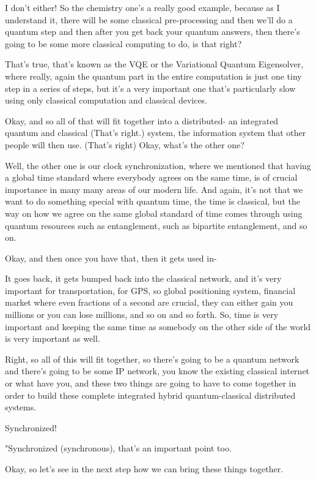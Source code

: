 \rrr I don't either! So the chemistry one's a really good example, because as I understand it, there will be some classical pre-processing and then we'll do a quantum step and then after you get back your quantum answers, then there's going to be some more classical computing to do, is that right?

\mmm That's true, that's known as the VQE or the Variational Quantum Eigensolver, where really, again the quantum part in the entire computation is just one tiny step in a series of steps, but it's a very important one that's particularly slow using only classical computation and classical devices.

\rrr Okay, and so all of that will fit together into a distributed- an integrated quantum and classical (That's right.) system, the information system that other people will then use. (That's right) Okay, what's the other one?

\mmm Well, the other one is our clock synchronization, where we mentioned that having a global time standard where everybody agrees on the same time, is of crucial importance in many many areas of our modern life. And again, it's not that we want to do something special with quantum time, the time is classical, but the way on how we agree on the same global standard of time comes through using quantum resources such as entanglement, such as bipartite entanglement, and so on.

\rrr Okay, and then once you have that, then it gets used in-

\mmm It goes back, it gets bumped back into the classical network, and it's very important for transportation, for GPS, so global positioning system, financial market where even fractions of a second are crucial, they can either gain you millions or you can lose millions, and so on and so forth. So, time is very important and keeping the same time as somebody on the other side of the world is very important as well.

\rrr Right, so all of this will fit together, so there's going to be a quantum network and there's going to be some IP network, you know the existing classical internet or what have you, and these two things are going to have to come together in order to build these complete integrated hybrid quantum-classical distributed systems.

\mmm Synchronized!

\rrr "Synchronized (synchronous), that's an important point too.

\mmm Okay, so let's see in the next step how we can bring these things together.

